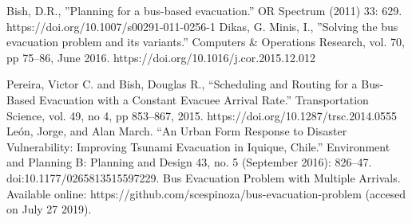 \documentclass[conference]{IEEEtran}
\begin{document}
\begin{thebibliography}{00}
 Bish, D.R., ''Planning for a bus-based evacuation.'' OR Spectrum (2011) 33: 629. https://doi.org/10.1007/s00291-011-0256-1
 Dikas, G. Minis, I., ''Solving the bus evacuation problem and its variants.'' Computers \& Operations Research,
vol. 70, pp 75--86, June 2016. https://doi.org/10.1016/j.cor.2015.12.012

 Pereira, Victor C. and Bish, Douglas R., ``Scheduling and Routing for a Bus-Based Evacuation with a Constant Evacuee Arrival Rate.'' Transportation Science, vol. 49, no 4, pp 853--867, 2015. https://doi.org/10.1287/trsc.2014.0555
 León, Jorge, and Alan March. “An Urban Form Response to Disaster Vulnerability: Improving Tsunami Evacuation in Iquique, Chile.” Environment and Planning B: Planning and Design 43, no. 5 (September 2016): 826–47. doi:10.1177/0265813515597229.
 Bus Evacuation Problem with Multiple Arrivals. Available online: https://github.com/scespinoza/bus-evacuation-problem (accesed on July 27 2019).


\end{thebibliography}
\end{document}
